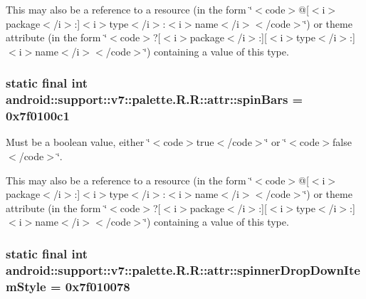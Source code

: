 This may also be a reference to a resource (in the form \char`\"{}$<$code$>$@\mbox{[}$<$i$>$package$<$/i$>$:\mbox{]}$<$i$>$type$<$/i$>$:$<$i$>$name$<$/i$>$$<$/code$>$\char`\"{}) or theme attribute (in the form \char`\"{}$<$code$>$?\mbox{[}$<$i$>$package$<$/i$>$:\mbox{]}\mbox{[}$<$i$>$type$<$/i$>$:\mbox{]}$<$i$>$name$<$/i$>$$<$/code$>$\char`\"{}) containing a value of this type. \hypertarget{classandroid_1_1support_1_1v7_1_1palette_1_1_r_1_1attr_cdbff5e97a9d0345b63f76af63797652}{
\subsubsection[{spinBars}]{\setlength{\rightskip}{0pt plus 5cm}static final int android::support::v7::palette.R.R::attr::spinBars = 0x7f0100c1}}
\label{classandroid_1_1support_1_1v7_1_1palette_1_1_r_1_1attr_cdbff5e97a9d0345b63f76af63797652}


Must be a boolean value, either \char`\"{}$<$code$>$true$<$/code$>$\char`\"{} or \char`\"{}$<$code$>$false$<$/code$>$\char`\"{}. 

This may also be a reference to a resource (in the form \char`\"{}$<$code$>$@\mbox{[}$<$i$>$package$<$/i$>$:\mbox{]}$<$i$>$type$<$/i$>$:$<$i$>$name$<$/i$>$$<$/code$>$\char`\"{}) or theme attribute (in the form \char`\"{}$<$code$>$?\mbox{[}$<$i$>$package$<$/i$>$:\mbox{]}\mbox{[}$<$i$>$type$<$/i$>$:\mbox{]}$<$i$>$name$<$/i$>$$<$/code$>$\char`\"{}) containing a value of this type. \hypertarget{classandroid_1_1support_1_1v7_1_1palette_1_1_r_1_1attr_e32c94e0b925844877823580ca63733b}{
\subsubsection[{spinnerDropDownItemStyle}]{\setlength{\rightskip}{0pt plus 5cm}static final int android::support::v7::palette.R.R::attr::spinnerDropDownItemStyle = 0x7f010078}}
\label{classandroid_1_1support_1_1v7_1_1palette_1_1_r_1_1attr_e32c94e0b925844877823580ca63733b}


